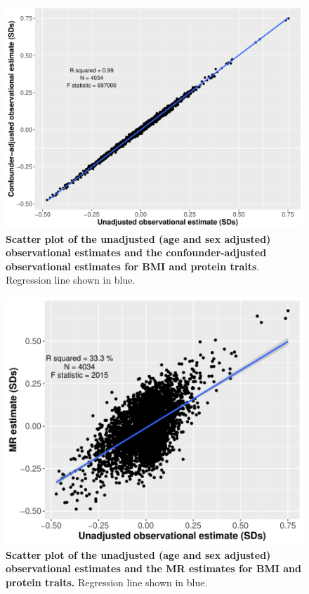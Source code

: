 \documentclass[11pt,twoside]{bristolthesis}
\begin{document}
\begin{figure}
\includegraphics[width=0.9\linewidth]{figure/BMI_protein_INTERVAL/obs_v_obs_adj_scatter} \caption[Scatter plot comparing the unadjusted and confounder-adjusted observational BMI-protein estimates]{\textbf{Scatter plot of the unadjusted (age and sex adjusted) observational estimates and the confounder-adjusted observational estimates for BMI and protein traits}. Regression line shown in blue.}\label{fig:Estimate-comparison-obs}
\end{figure}


\begin{figure}
\includegraphics[width=0.9\linewidth]{figure/BMI_protein_INTERVAL/unadj_obs_MR_scatter_small} \caption[Scatter plot comparing the observational and MR BMI-protein estimates]{\textbf{Scatter plot of the unadjusted (age and sex adjusted) observational estimates and the MR estimates for BMI and protein traits.} Regression line shown in blue.}\label{fig:Estimate-comparison-obs-mr}
\end{figure}
\end{document}
